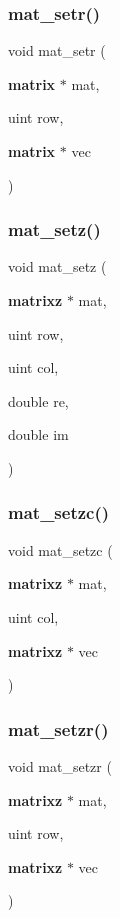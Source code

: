 \subsubsection{mat\+\_\+setr()}
{\footnotesize\ttfamily void mat\+\_\+setr (\begin{DoxyParamCaption}\item[{\textbf{ matrix} $\ast$}]{mat,  }\item[{uint}]{row,  }\item[{\textbf{ matrix} $\ast$}]{vec }\end{DoxyParamCaption})}

\mbox{\label{mat_lib_8h_a9cf4e4fd051e7a26b0ed35366ad1dbb8}} 
\subsubsection{mat\+\_\+setz()}
{\footnotesize\ttfamily void mat\+\_\+setz (\begin{DoxyParamCaption}\item[{\textbf{ matrixz} $\ast$}]{mat,  }\item[{uint}]{row,  }\item[{uint}]{col,  }\item[{double}]{re,  }\item[{double}]{im }\end{DoxyParamCaption})}

\mbox{\label{mat_lib_8h_a43ae04f613801bcc92cc814365c456e6}} 
\subsubsection{mat\+\_\+setzc()}
{\footnotesize\ttfamily void mat\+\_\+setzc (\begin{DoxyParamCaption}\item[{\textbf{ matrixz} $\ast$}]{mat,  }\item[{uint}]{col,  }\item[{\textbf{ matrixz} $\ast$}]{vec }\end{DoxyParamCaption})}

\mbox{\label{mat_lib_8h_a850461a842f3dc98d65e0ab25449ffff}} 
\subsubsection{mat\+\_\+setzr()}
{\footnotesize\ttfamily void mat\+\_\+setzr (\begin{DoxyParamCaption}\item[{\textbf{ matrixz} $\ast$}]{mat,  }\item[{uint}]{row,  }\item[{\textbf{ matrixz} $\ast$}]{vec }\end{DoxyParamCaption})}

